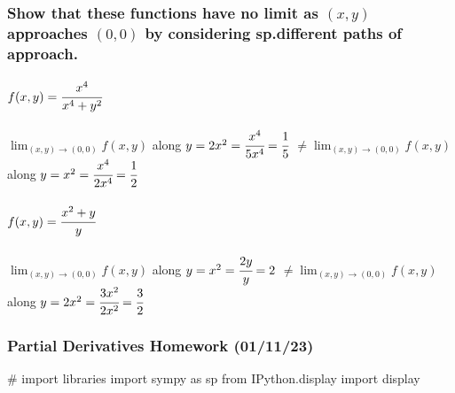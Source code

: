\documentclass[
  letterpaper,
  DIV=11,
  numbers=noendperiod]{scrartcl}
\let\oldparagraph\paragraph
\renewcommand{\paragraph}[1]{\oldparagraph{#1}\mbox{}}
\newenvironment{Shaded}{\begin{snugshade}}{\end{snugshade}}
\newcommand{\CommentTok}[1]{\textcolor[rgb]{0.37,0.37,0.37}{#1}}
\newcommand{\ImportTok}[1]{\textcolor[rgb]{0.00,0.46,0.62}{#1}}
\newcommand{\NormalTok}[1]{\textcolor[rgb]{0.00,0.23,0.31}{#1}}
\begin{document}
\hypertarget{show-that-these-functions-have-no-limit-as-x-y-approaches-0-0-by-considering-sp.different-paths-of-approach.}{%
\subsubsection{\texorpdfstring{Show that these functions have no limit
as \((x, y)\) approaches \((0, 0)\) by considering sp.different paths of
approach.}{Show that these functions have no limit as (x, y) approaches (0, 0) by considering sp.different paths of approach.}}\label{show-that-these-functions-have-no-limit-as-x-y-approaches-0-0-by-considering-sp.different-paths-of-approach.}}

\hypertarget{fxy-cfracx4x4y2}{%
\paragraph{\texorpdfstring{\(f(x,y) = \cfrac{x^4}{x^4+y^2}\)}{f(x,y) = \textbackslash cfrac\{x\^{}4\}\{x\^{}4+y\^{}2\}}}\label{fxy-cfracx4x4y2}}

\(\lim_{(x, y)\rightarrow(0, 0)} f(x, y)\) along
\(y=2x^2 = \cfrac{x^4}{5x^4}=\cfrac{1}{5}\)
\(\ne \lim_{(x, y)\rightarrow(0, 0)} f(x, y)\) along
\(y=x^2 = \cfrac{x^4}{2x^4} = \cfrac{1}{2}\)

\hypertarget{fx-y-cfracx2yy}{%
\paragraph{\texorpdfstring{\(f(x, y) = \cfrac{x^2+y}{y}\)}{f(x, y) = \textbackslash cfrac\{x\^{}2+y\}\{y\}}}\label{fx-y-cfracx2yy}}

\(\lim_{(x, y)\rightarrow(0,0)} f(x, y)\) along
\(y=x^2 = \cfrac{2y}{y} = 2\)
\(\ne \lim_{(x, y)\rightarrow(0,0)} f(x, y)\) along
\(y=2x^2 = \cfrac{3x^2}{2x^2} = \cfrac{3}{2}\)

\hypertarget{partial-derivatives-homework-011123}{%
\subsubsection{Partial Derivatives Homework
(01/11/23)}\label{partial-derivatives-homework-011123}}

\begin{Shaded}
\begin{Highlighting}[numbers=left,,]
\CommentTok{\# import libraries}
\ImportTok{import}\NormalTok{ sympy }\ImportTok{as}\NormalTok{ sp}
\ImportTok{from}\NormalTok{ IPython.display }\ImportTok{import}\NormalTok{ display}
\end{Highlighting}
\end{Shaded}
\end{document}
